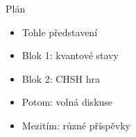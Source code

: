 \documentclass[11pt,t]{beamer}
\newenvironment{slidecontent}
	{\vspace*{\fill}
	}
	{
	\vspace*{\fill}
}
\newenvironment{slidetitle}
	{\vspace*{0.5cm}\hspace*{.2cm}\Huge
	}
	{
	\vspace*{0.6cm}
}
\begin{document}
{
\begin{frame}[plain]
\begin{slidetitle}
Plán
\end{slidetitle}
\begin{slidecontent}
\begin{itemize}
\item Tohle představení
\item Blok 1: kvantové stavy
\item Blok 2: CHSH hra
\item Potom: volná diskuse
\item Mezitím: různé příspěvky
\end{itemize}
\end{slidecontent}
\end{frame}
}
\end{document}
